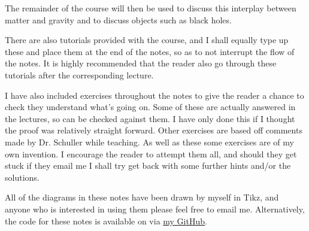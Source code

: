 The remainder of the course will then be used to discuss this interplay between matter and gravity and to discuss objects such as black holes.

There are also tutorials provided with the course, and I shall equally type up these and place them at the end of the notes, so as to not interrupt the flow of the notes. It is highly recommended that the reader also go through these tutorials after the corresponding lecture. 

I have also included exercises throughout the notes to give the reader a chance to check they understand what's going on. Some of these are actually answered in the lectures, so can be checked against them. I have only done this if I thought the proof was relatively straight forward. Other exercises are based off comments made by Dr. Schuller while teaching. As well as these some exercises are of my own invention. I encourage the reader to attempt them all, and should they get stuck if they email me I shall try get back with some further hints and/or the solutions. 

All of the diagrams in these notes have been drawn by myself in Tikz, and anyone who is interested in using them please feel free to email me. Alternatively, the code for these notes is available on via \href{https://github.com/RichieDadhley}{my GitHub}.